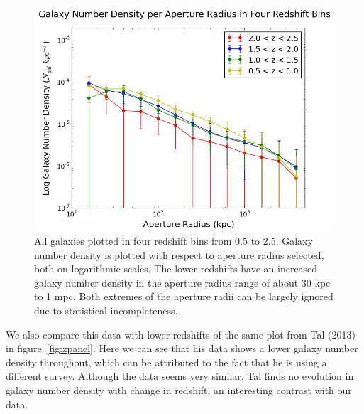 \documentclass[apj]{emulateapj}
\begin{document}
\begin{figure}
\centering
\graphicspath{{C:/3d_hst/2015_finals/aperture_distance/}}
\includegraphics[width=\linewidth]{temp_z_final}
\caption{\footnotesize All galaxies plotted in four redshift bins from 0.5 to 2.5. Galaxy number density is plotted with respect to aperture radius selected, both on logarithmic scales.  The lower redshifts have an increased galaxy number density in the aperture radius range of about 30 kpc to 1 mpc. Both extremes of the aperture radii can be largely ignored due to statistical incompleteness.}
\label{fig:z}
\end{figure}

We also compare this data with lower redshifts of the same plot from Tal (2013)~\cite{2013ApJ...769...31T} in figure~\ref{fig:zpanel}. Here we can see that his data shows a lower galaxy number density throughout, which can be attributed to the fact that he is using a different survey. Although the data seems very similar, Tal finds no evolution in galaxy number density with change in redshift, an interesting contrast with our data. 
\end{document}
